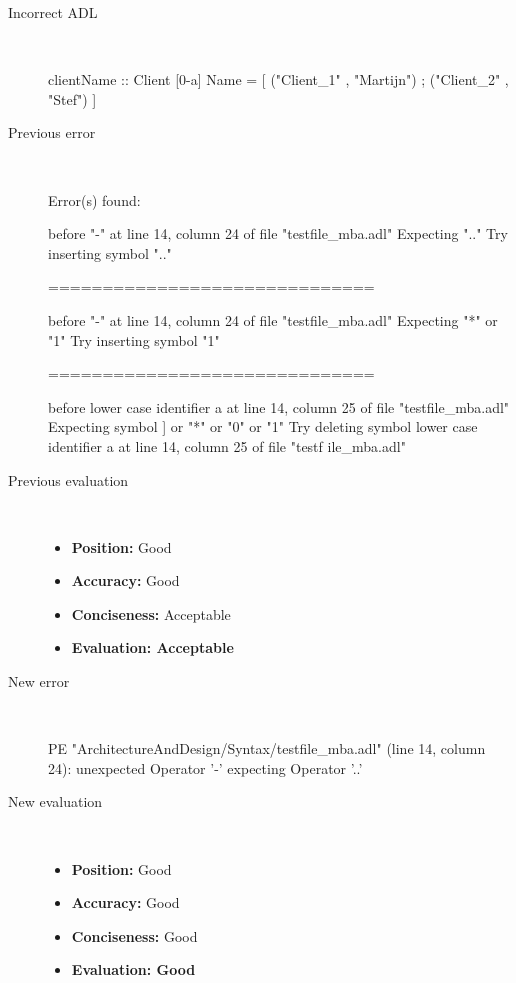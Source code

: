 \begin{description}
  \item[Incorrect ADL]~\\
\begin{adl}
clientName :: Client [0-a] Name =
    [ ("Client_1"      , "Martijn")
    ; ("Client_2"      , "Stef")
    ]\end{adl}
  \item[Previous error]~\\
\begin{haskell}
Error(s) found:

before "-" at line 14, column 24 of file "testfile_mba.adl"
Expecting ".."
Try inserting symbol ".."

==============================

before "-" at line 14, column 24 of file "testfile_mba.adl"
Expecting "*" or "1"
Try inserting symbol "1"

==============================

before lower case identifier a at line 14, column 25 of file "testfile_mba.adl"
Expecting symbol ] or "*" or "0" or "1"
Try deleting symbol lower case identifier a at line 14, column 25 of file "testf
ile_mba.adl"\end{haskell}
  \item[Previous evaluation]~\\
    \begin{itemize}
    \item \textbf{Position:} Good
    \item \textbf{Accuracy:} Good
    \item \textbf{Conciseness:} Acceptable
    \item \textbf{Evaluation: Acceptable}
    \end{itemize}
  \item[New error]~\\
\begin{haskell}
PE "ArchitectureAndDesign/Syntax/testfile_mba.adl" (line 14, column 24):
unexpected Operator '-'
expecting Operator '..'
\end{haskell}
  \item[New evaluation]~\\
    \begin{itemize}
    \item \textbf{Position:} Good
    \item \textbf{Accuracy:} Good
    \item \textbf{Conciseness:} Good
    \item \textbf{Evaluation: Good}
    \end{itemize}
  \end{description}

